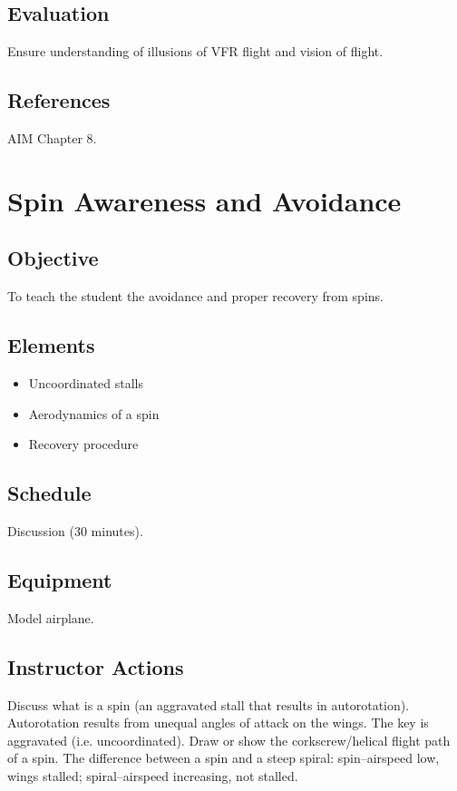 \documentclass[twoside,openright]{report}
\begin{document}
\section{Evaluation}

Ensure understanding of illusions of VFR flight and vision of flight.

\section{References}

AIM Chapter 8.

\chapter{Spin Awareness and Avoidance}

\section{Objective}

To teach the student the avoidance and proper recovery from spins.

\section{Elements}

\begin{itemize}
  \item Uncoordinated stalls
  \item Aerodynamics of a spin
  \item Recovery procedure
\end{itemize}

\section{Schedule}

Discussion (30 minutes).

\section{Equipment}

Model airplane.

\section{Instructor Actions}

Discuss what is a spin (an aggravated stall that results in autorotation).
Autorotation results from unequal angles of attack on the wings. The key is
aggravated (i.e. uncoordinated). Draw or show the corkscrew/helical flight path
of a spin. The difference between a spin and a steep spiral: spin--airspeed low,
wings stalled; spiral--airspeed increasing, not stalled.
\end{document}
